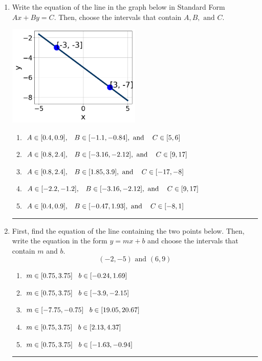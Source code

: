 \documentclass[14pt]{extbook}
\newcommand{\litem}[1]{\item#1\hspace*{-1cm}\rule{\textwidth}{0.4pt}}
\begin{document}
\begin{enumerate}
{\begin{enumerate}[label=\Alph*.]
\end{enumerate} }
\litem{
Write the equation of the line in the graph below in Standard Form $Ax+By=C$. Then, choose the intervals that contain $A, B, \text{ and } C$.
\begin{center}
    \includegraphics[width=0.5\textwidth]{../Figures/linearGraphToStandardCopyC.png}
\end{center}
\begin{enumerate}[label=\Alph*.]
\item \( A \in [0.4, 0.9], \hspace{3mm} B \in [-1.1, -0.84], \text{ and } \hspace{3mm} C \in [5, 6] \)
\item \( A \in [0.8, 2.4], \hspace{3mm} B \in [-3.16, -2.12], \text{ and } \hspace{3mm} C \in [9, 17] \)
\item \( A \in [0.8, 2.4], \hspace{3mm} B \in [1.85, 3.9], \text{ and } \hspace{3mm} C \in [-17, -8] \)
\item \( A \in [-2.2, -1.2], \hspace{3mm} B \in [-3.16, -2.12], \text{ and } \hspace{3mm} C \in [9, 17] \)
\item \( A \in [0.4, 0.9], \hspace{3mm} B \in [-0.47, 1.93], \text{ and } \hspace{3mm} C \in [-8, 1] \)

\end{enumerate} }
\litem{
First, find the equation of the line containing the two points below. Then, write the equation in the form $ y=mx+b $ and choose the intervals that contain $m$ and $b$.\[ (-2, -5) \text{ and } (6, 9) \]\begin{enumerate}[label=\Alph*.]
\item \( m \in [0.75, 3.75] \hspace*{3mm} b \in [-0.24, 1.69] \)
\item \( m \in [0.75, 3.75] \hspace*{3mm} b \in [-3.9, -2.15] \)
\item \( m \in [-7.75, -0.75] \hspace*{3mm} b \in [19.05, 20.67] \)
\item \( m \in [0.75, 3.75] \hspace*{3mm} b \in [2.13, 4.37] \)
\item \( m \in [0.75, 3.75] \hspace*{3mm} b \in [-1.63, -0.94] \)


\end{enumerate}}
\end{enumerate}
\end{document}
